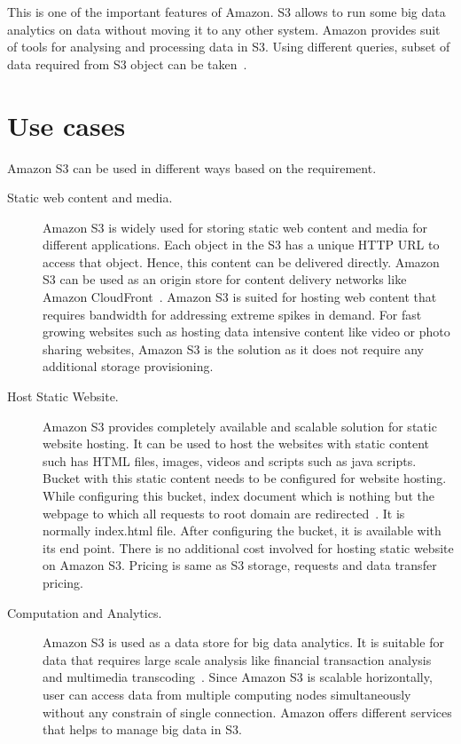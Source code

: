This is one of the important features of Amazon. S3 allows to run some big data
analytics on data without moving it to any other system. Amazon provides suit of
tools for analysing and processing data in S3. Using different queries, subset
of data required from S3 object can be taken~\cite{hid-sp18-420-amazon-S3}.

\section{Use cases}
Amazon S3 can be used in different ways based on the requirement. 

\begin{description}
\item [Static web content and media.] Amazon S3 is widely used for storing
static web content and media for different applications. Each object in the S3
has a unique HTTP URL to access that object. Hence, this content can be
delivered directly. Amazon S3 can be used as an origin store for content
delivery networks like Amazon
CloudFront~\cite{hid-sp18-420-amazon-cloudfront}. Amazon S3 is suited for
hosting web content that requires bandwidth for addressing extreme spikes in
demand. For fast growing websites such as hosting data intensive content like
video or photo sharing websites, Amazon S3 is the solution as it does not
require any additional storage provisioning.


\item [Host Static Website.] Amazon S3 provides completely available and
scalable solution for static website hosting. It can be used to host the
websites with static content such has HTML files, images, videos and scripts
such as java scripts.
Bucket with this static content needs to be configured for website hosting.
While configuring this bucket, index document which is nothing but the webpage
to which all requests to root domain are
redirected~\cite{hid-sp18-420-amazon-S3-details}. It is normally index.html
file.
After configuring the bucket, it is available with its end point. There is no
additional cost involved for hosting static website on Amazon S3. Pricing is
same as S3 storage, requests and data transfer pricing.


\item [Computation and Analytics.] Amazon S3 is used as a data store for big
data analytics. It is suitable for data that requires large scale analysis like
financial transaction analysis and multimedia
transcoding~\cite{hid-sp18-420-amazon-S3-FAQ}.
Since Amazon S3 is scalable horizontally, user can access data from multiple
computing nodes
simultaneously without any constrain of single connection. Amazon offers
different services that helps to manage big data in S3.



\end{description}
